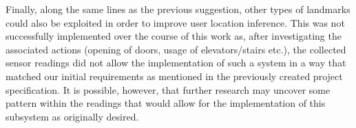 \documentclass[main.tex]{subfiles}
\begin{document}
            Finally, along the same lines as the previous suggestion, other types of landmarks could also be exploited in order to improve user location inference. This
            was not successfully implemented over the course of this work as, after investigating the associated actions (opening of doors, usage of elevators/stairs etc.),
            the collected sensor readings did not allow the implementation of such a system in a way that matched our initial requirements as mentioned in the previously
            created project specification. It is possible, however, that further research may uncover some pattern within the readings that would allow for the implementation
            of this subsystem as originally desired.
\end{document}
